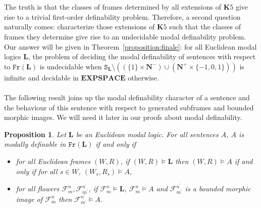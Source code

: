 \documentclass[draft]{article}
\newtheorem{proposition}{Proposition}
\def\Fr{\mathtt{Fr}}
\def\EXPSPACE{\mathbf{EXPSPACE}}
\def\L{\mathbf{L}}
\def\K{\mathbf{K}}
\begin{document}
%
%
\\
\\
%
%
The truth is that the classes of frames determined by all extensions of $\K5$ give rise to a trivial first-order definability problem.
Therefore, a second question naturally comes: characterize those extensions of $\K5$ such that the classes of frames they determine give rise to an undecidable modal definability problem.
Our answer will be given in Theorem~\ref{proposition:finale}: for all Euclidean modal logics $\L$, the problem of deciding the modal definability of sentences with respect to $\Fr(\L)$ is undecidable when $\mathtt{S}_{\L}{\setminus}((\{1\}{\times}\mathbf{N}^{-}){\cup}(\mathbf{N}^{+}{\times}\{{-}1,0,1\}))$ is infinite and decidable in $\EXPSPACE$ otherwise.
%
%
%
%
\\
\\
%
%
The following result joins up the modal definability character of a sentence and the behaviour of this sentence with respect to generated subframes and bounded morphic images.
We will need it later in our proofs about modal definability.
%
%
\begin{proposition}\label{proposition:characterizing:modal:definability}
%
%
Let $\L$ be an Euclidean modal logic.
For all sentences $A$, $A$ is modally definable in $\Fr(\L)$ if and only if
%
%
\begin{itemize}
%
%
\item for all Euclidean frames $(W,R)$, if $(W,R){\models}\L$ then $(W,R){\models}A$ if and only if for all $s{\in}W$, $(W_{s},R_{s}){\models}A$,
%
%
\item for all flowers ${\mathcal F}_{m}^{n},{\mathcal F}_{m^{\prime}}^{n^{\prime}}$, if ${\mathcal F}_{m}^{n}{\models}\L$, ${\mathcal F}_{m}^{n}{\models}A$ and ${\mathcal F}_{m^{\prime}}^{n^{\prime}}$ is a bounded morphic image of ${\mathcal F}_{m}^{n}$ then ${\mathcal F}_{m^{\prime}}^{n^{\prime}}{\models}A$.
%
%
\end{itemize}
%
%
\end{proposition}
\end{document}
